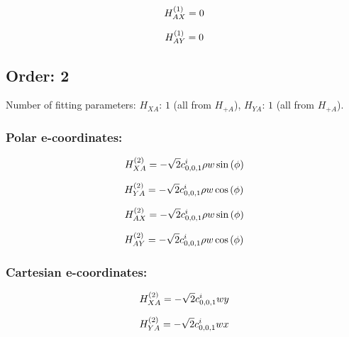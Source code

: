 \documentclass[fleqn]{article}
\begin{document}
\begin{dmath*}
H_{AX}^{(1)}=0\\
\end{dmath*}

\begin{dmath*}
H_{AY}^{(1)}=0\\
\end{dmath*}
\subsection{Order: 2}
Number of fitting parameters: $H_{XA}$: $1$ (all from $H_{+A}$), $H_{YA}$: $1$ (all from $H_{+A}$).
\subsubsection*{Polar e-coordinates:}

\begin{dmath*}
H_{XA}^{(2)}=- \sqrt{2} c^{i}_{0,0,1} \rho w \sin{\left (\phi \right )}\\
\end{dmath*}

\begin{dmath*}
H_{YA}^{(2)}=-  \sqrt{2} c^{i}_{0,0,1} \rho w \cos{\left (\phi \right )}\\
\end{dmath*}

\begin{dmath*}
H_{AX}^{(2)}=- \sqrt{2} c^{i}_{0,0,1} \rho w \sin{\left (\phi \right )}\\
\end{dmath*}

\begin{dmath*}
H_{AY}^{(2)}=-  \sqrt{2} c^{i}_{0,0,1} \rho w \cos{\left (\phi \right )}\\
\end{dmath*}
\subsubsection*{Cartesian e-coordinates:}

\begin{dmath*}
H_{XA}^{(2)}=- \sqrt{2} c^{i}_{0,0,1} w y\\
\end{dmath*}

\begin{dmath*}
H_{YA}^{(2)}=-  \sqrt{2} c^{i}_{0,0,1} w x\\
\end{dmath*}
\end{document}
